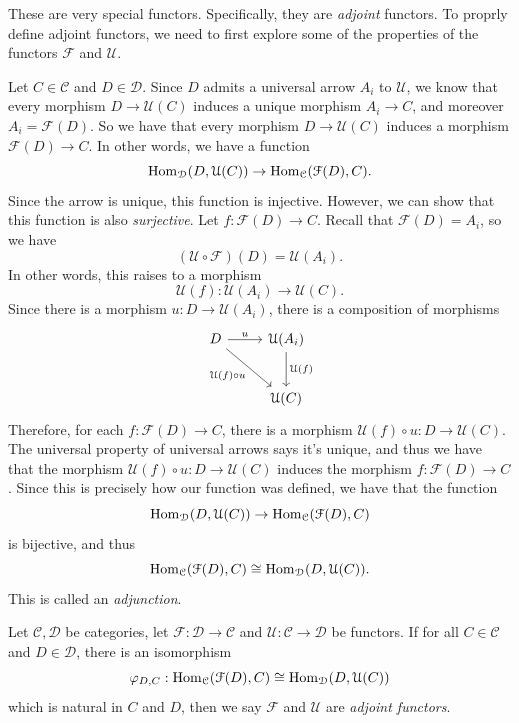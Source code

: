These are very special functors. Specifically, they are \emph{adjoint} functors. To proprly define adjoint functors, we need to first explore some of the properties of the functors $\mathcal{F} $ and $\mathcal{U} $. 

Let $C\in \mathcal{C} $ and $D\in \mathcal{D} $. Since $D$ admits a universal arrow $A_i$ to $\mathcal{U} $, we know that every morphism $D\to \mathcal{U} (C)$ induces a unique morphism $A_i\to C$, and moreover $A_i=\mathcal{F} (D)$. So we have that every morphism $D\to \mathcal{U} (C)$ induces a morphism $\mathcal{F} (D)\to C$. In other words, we have a function
\[
	\operatorname{Hom}_{\mathcal{D} }(D, \mathcal{U} (C)) \to \operatorname{Hom}_{\mathcal{C} }(\mathcal{F} (D), C) 
.\]
Since the arrow is unique, this function is injective. However, we can show that this function is also \emph{surjective}. Let $f : \mathcal{F} (D) \to C$. Recall that $\mathcal{F} (D)=A_i$, so we have
\[
	(\mathcal{U} \circ \mathcal{F} )(D)=\mathcal{U} (A_i)
.\]
In other words, this raises to a morphism
\[
	\mathcal{U} (f): \mathcal{U} (A_i) \to \mathcal{U} (C)
.\]
Since there is a morphism $u : D \to \mathcal{U} (A_i)$, there is a composition of morphisms
\[\begin{tikzcd}[row sep = 2.5em, column sep = 2.5em]
D\ar[" \mathcal{U} (f)\circ u "', dr] \ar[" u ", r]  & \mathcal{U} (A_i)\ar[" \mathcal{U} (f) ", d]  \\
 & \mathcal{U} (C)
\end{tikzcd}\]
Therefore, for each $f : \mathcal{F} (D) \to C$, there is a morphism $\mathcal{U} (f)\circ u : D \to \mathcal{U} (C)$. The universal property of universal arrows says it's unique, and thus we have that the morphism $\mathcal{U} (f)\circ u : D \to \mathcal{U} (C)$ induces the morphism $f : \mathcal{F} (D) \to C$. Since this is precisely how our function was defined, we have that the function
\[
	\operatorname{Hom}_{\mathcal{D} }(D, \mathcal{U} (C)) \to \operatorname{Hom}_{\mathcal{C} }(\mathcal{F} (D), C) 
\]
is bijective, and thus
\[
	\operatorname{Hom}_{\mathcal{C} }(\mathcal{F} (D), C) \cong \operatorname{Hom}_{\mathcal{D} }(D, \mathcal{U} (C)) 
.\]
This is called an \emph{adjunction}.

\begin{definition}[Adjunction]\label{dfn:8}
	Let $\mathcal{C} ,\mathcal{D} $ be categories, let $\mathcal{F} : \mathcal{D}  \to \mathcal{C} $ and $\mathcal{U} : \mathcal{C}  \to \mathcal{D} $ be functors. If for all $C\in \mathcal{C} $ and $D\in \mathcal{D} $, there is an isomorphism
	\[
		\varphi_{D,C} : \operatorname{Hom}_{\mathcal{C} }(\mathcal{F} (D), C) \cong \operatorname{Hom}_{\mathcal{D} }(D, \mathcal{U} (C)) 
	\]
	which is natural in $C$ and $D$, then we say $\mathcal{F} $ and $\mathcal{U} $ are \emph{adjoint functors}.
\end{definition}

